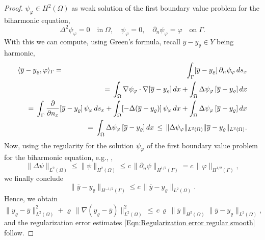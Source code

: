 \documentclass{article}
\numberwithin{equation}{section}
\begin{document}
\begin{proof}
  $\psi_\varphi \in H^2(\Omega)$ as weak solution of
  the first boundary value problem for the biharmonic equation,
  \begin{equation}\label{biharmonic equation}
    \Delta^2 \psi_\varphi = 0 \quad \mbox{in} \; \Omega, \quad
    \psi_\varphi = 0, \quad
    \partial_n \psi_\varphi = \varphi \quad
    \mbox{on} \; \Gamma .
  \end{equation}
  With this we can compute, using Green's formula, recall
  $\overline{y} - y_\varrho \in Y$ being harmonic,
  \begin{eqnarray*}
  \langle \overline{y}-y_\varrho , \varphi \rangle_\Gamma
    & = & \int_\Gamma [\overline{y} - y_\varrho ] \,
          \partial_n \psi_\varphi \, ds_x \\
    && \hspace*{-2cm} = \, \int_\Omega \nabla \psi_\varphi \cdot \nabla
          [\overline{y}-y_\varrho] \, dx +
          \int_\Omega \Delta \psi_\varphi \,
          [\overline{y}-y_\varrho] \, dx \\
    && \hspace*{-2cm} = \, \int_\Gamma \frac{\partial}{\partial n_x}
          [\overline{y}-y_\varrho] \, \psi_\varphi \, ds_x
          + \int_\Omega [- \Delta (\overline{y}-y_\varrho)] \,
          \psi_\varphi \, dx +
          \int_\Omega \Delta \psi_\varphi \, [\overline{y}-y_\varrho] \, dx \\
    && \hspace*{-2cm}
       = \, \int_\Omega \Delta \psi_\varphi \, [\overline{y}-y_\varrho] \, dx
       \, \leq \, \| \Delta \psi_\varphi \|_{L^2(\Omega)}
       \| \overline{y}-y_\varrho \|_{L^2(\Omega)} .
  \end{eqnarray*}
  Now, using the regularity for the solution $\psi_\varphi$
  of the first boundary
  value problem for the biharmonic equation, e.g.,
  \cite[Subsection 2.4]{GlowinskiPironneau:1979SIAMRev},
  \[
    \| \Delta \psi \|_{L^2(\Omega)} \leq
    \| \psi \|_{H^2(\Omega)} \leq c \,
    \| \partial_n \psi \|_{H^{1/2}(\Gamma)} = c\,
    \| \varphi \|_{H^{1/2}(\Gamma)} ,
  \]
  we finally conclude
  \[
    \| \overline{y} - y_\varrho \|_{H^{-1/2}(\Gamma)} \leq c \,
    \| \overline{y} - y_\varrho \|_{L^2(\Omega)} .
  \]
  Hence, we obtain
  \[
    \| y_\varrho - \overline{y} \|^2_{L^2(\Omega)}
    + \varrho \, \| \nabla (y_\varrho - \overline{y}) \|^2_{L^2(\Omega)}   
    \, \leq \, c \, \varrho \, \| \overline{y} \|_{H^2(\Omega)}
    \| \overline{y} - y_\varrho \|_{L^2(\Omega)},
  \]
  and the regularization error estimates
  \eqref{Eqn:Regularization error regular smooth} follow.
\end{proof}
\end{document}
